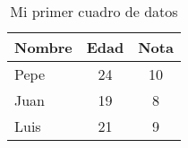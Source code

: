 \begin{table}[!ht]
\begin{center}
\begin{tabular}{|l|c|c|}
\hline
Nombre & Edad & Nota \\ \hline
Pepe   &   24 &   10 \\ \hline
Juan   &   19 &    8 \\ \hline
Luis   &   21 &    9 \\ \hline
\end{tabular}
\end{center}
\caption{Mi primer cuadro de datos}
\label{tab}
\end{table}